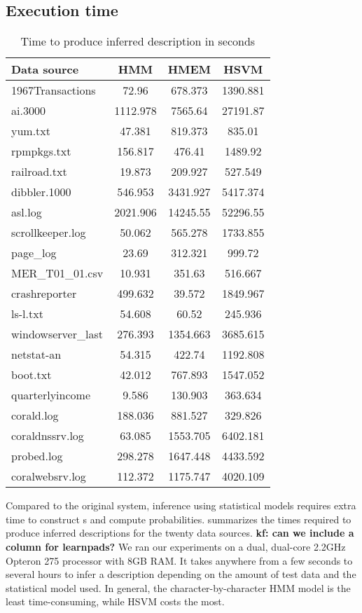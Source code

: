 \subsection{Execution time}
\begin{table}[th]
\begin{center}
\begin{tabular}{|l||c|c|c|}\hline
Data source & HMM & HMEM & HSVM \\ \hline 
1967Transactions & 72.96 & 678.373 & 1390.881   \\\hline 
ai.3000 & 1112.978 & 7565.64 & 27191.87 \\ \hline
yum.txt & 47.381 &  819.373 & 835.01\\ \hline
rpmpkgs.txt & 156.817 & 476.41 & 1489.92\\ \hline
railroad.txt & 19.873 & 209.927 & 527.549  \\ \hline
dibbler.1000 & 546.953 & 3431.927 & 5417.374   \\ \hline
asl.log & 2021.906 & 14245.55 & 52296.55 \\ \hline
scrollkeeper.log  &  50.062 & 565.278 & 1733.855 \\ \hline
page\_log  & 23.69 & 312.321 & 999.72 \\ \hline
MER\_T01\_01.csv & 10.931 & 351.63 & 516.667 \\ \hline
crashreporter & 499.632 & 39.572 & 1849.967 \\ \hline
ls-l.txt & 54.608 & 60.52 & 245.936 \\ \hline
windowserver\_last & 276.393 & 1354.663 & 3685.615 \\ \hline
netstat-an & 54.315 & 422.74 & 1192.808 \\ \hline
boot.txt & 42.012 &  767.893 & 1547.052 \\ \hline
quarterlyincome & 9.586 & 130.903 & 363.634   \\ \hline
corald.log & 188.036 &  881.527 & 329.826 \\ \hline
coraldnssrv.log  & 63.085 &  1553.705 & 6402.181\\ \hline
probed.log & 298.278 & 1647.448 & 4433.592 \\ \hline
coralwebsrv.log & 112.372 & 1175.747 & 4020.109 \\\hline
\end{tabular}
\caption{Time to produce inferred description in seconds}
\label{tab:time}
\end{center}
\end{table}

Compared to the original \learnpads{} system, inference using
statistical models requires extra time to construct \seqset{}s and
compute probabilities.  summarizes the times required
to produce inferred descriptions for the twenty data sources.
{\bf kf: can we include a column for learnpads?}
We ran our experiments on a dual, dual-core 2.2GHz Opteron 275 
processor with 8GB RAM. 
It takes anywhere from a few seconds to several hours to
infer a description depending on the amount of test data
and the statistical model used. In general, the character-by-character
HMM model is the least time-consuming, while HSVM costs the most.


